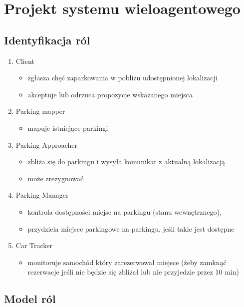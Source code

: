 \newpage
\section{Projekt systemu wieloagentowego}

\subsection{Identyfikacja ról}

\begin{enumerate}

\item Client 
\begin{itemize}
    \item zgłasza chęć zaparkowania w pobliżu udostępnionej lokalizacji
    \item akceptuje lub odrzuca propozycje wskazanego miejsca 
\end{itemize}
 
\item Parking mapper
\begin{itemize}
    \item mapuje istniejące parkingi
\end{itemize}
\item Parking Approacher
\begin{itemize}
    \item zbliża się do parkingu i wysyła komunikat z aktualną lokalizacją
\item może zrezygnować
\end{itemize}
\item Parking Manager
\begin{itemize}
    \item kontrola dostępności miejsc na parkingu (stanu wewnętrznego),
\item przydziela miejsce parkingowe na parkingu, jeśli takie jest dostępne
\end{itemize}
\item Car Tracker 
\begin{itemize}
    \item monitoruje samochód który zarezerwował miejsce (żeby zamknąć rezerwacje jeśli
 nie będzie się zbliżał lub nie przyjedzie przez 10 min)
\end{itemize}
\end{enumerate}




\newpage
\subsection{Model ról}

